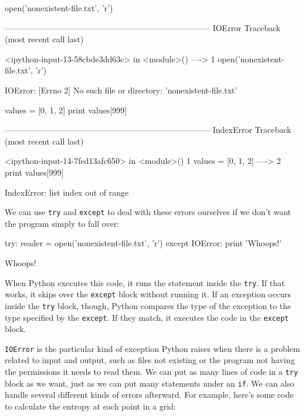 \documentclass{book}
\begin{document}
\begin{VerbIn}
open('nonexistent-file.txt', 'r')
\end{VerbIn}

\begin{VerbErr}
---------------------------------------------------------------------------
IOError                                   Traceback (most recent call last)

<ipython-input-13-58cbde3dd63c> in <module>()
----> 1 open('nonexistent-file.txt', 'r')

IOError: [Errno 2] No such file or directory: 'nonexistent-file.txt'
\end{VerbErr}

\begin{VerbIn}
values = [0, 1, 2]
print values[999]
\end{VerbIn}

\begin{VerbErr}
---------------------------------------------------------------------------
IndexError                                Traceback (most recent call last)

<ipython-input-14-7fed13afc650> in <module>()
1 values = [0, 1, 2]
----> 2 print values[999]

IndexError: list index out of range
\end{VerbErr}

We can use \texttt{try} and \texttt{except} to deal with these errors
ourselves if we don't want the program simply to fall over:

\begin{VerbIn}
try:
    reader = open('nonexistent-file.txt', 'r')
except IOError:
    print 'Whoops!'
\end{VerbIn}

\begin{VerbOut}
Whoops!
\end{VerbOut}

When Python executes this code, it runs the statement inside the
\texttt{try}. If that works, it skips over the \texttt{except} block
without running it. If an exception occurs inside the \texttt{try}
block, though, Python compares the type of the exception to the type
specified by the \texttt{except}. If they match, it executes the code in
the \texttt{except} block.

\texttt{IOError} is the particular kind of exception Python raises when
there is a problem related to input and output, such as files not
existing or the program not having the permissions it needs to read
them. We can put as many lines of code in a \texttt{try} block as we
want, just as we can put many statements under an \texttt{if}. We can
also handle several different kinds of errors afterward. For example,
here's some code to calculate the entropy at each point in a grid:
\end{document}
